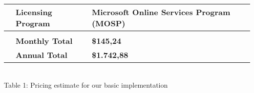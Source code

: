 \begin{adjustbox}{angle=90}
\begin{tabularx}{\textheight}{|l||X|m{4cm}|}
                                                        & Licensing Program                                                                                                                                                                                                                                & Microsoft Online Services Program (MOSP) \\ \hline
            \multicolumn{3}{|l|}{}                \\ \hline\hline
                                                       & \textbf{Monthly Total}                                                                                                                                                                                                                           & \textbf{\$145,24}                         \\ \hline
                                                       & \textbf{Annual Total}                                                                                                                                                                                                                            & \textbf{\$1.742,88}                        \\ \hline

                \end{tabularx}
                \label{azPriceT1_1}
                
\end{adjustbox}\\
\caption{Table 1: Pricing estimate for our basic implementation}
